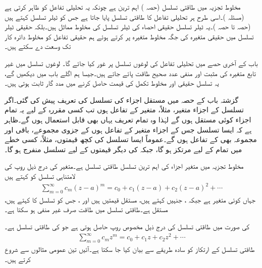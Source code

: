 مخلوط تجزیہ میں طاقتی تسلسل (حصہ )  اہم ترین ہے چونکہ یہ تحلیلی تفاعل کو ظاہر کرتی ہے (مسئلہ )۔اسی طرح ہر تحلیلی تفاعل کا طاقتی تسلسل پایا جاتا ہے جس کو ٹیلر تسلسل کہتے ہیں (حصہ  تا حصہ )۔یہ  ٹیلر تسلسل حقیقی احصاء کی ٹیلر تسلسل کی مخلوط مماثل ہیں۔بلکہ حقیقی ٹیلر تسلسل میں حقیقی متغیرہ کی جگہ مخلوط متغیرہ پر کرتے ہوئے ہم حقیقی تفاعل کو مخلوط دائرہ کار تک وسعت دے سکتے ہیں۔

باب کے آخری حصے میں تحلیلی تفاعل کی لوغوں تسلسل پر غور کیا جائے گا۔ لوغوں تسلسل میں غیر تابع متغیرہ کی مثبت اور منفی عدد صحیح طاقت پائے جاتے ہیں۔جیسا ہم اگلے باب میں دیکھیں گے، یہ تسلسل حقیقی اور مخلوط تکمل کی قیمت حاصل کرنے میں مدد گار ثابت ہوتی ہیں۔

گزشتہ باب کے حصہ  میں مستقل اجزاء کی تسلسل کی تعریف پیش کی گئی۔اگر تسلسل کے اجزاء متغیر، مثلاً، متغیر  کے تفاعل  ہوں تب کسی مقررہ  کے لیے یہ تمام اجزاء کوئی مستقل ہوں گے لہٰذا وہ تمام تعریف یہاں بھی قابل استعمال ہوں گے۔ظاہر ہے کہ ایسا تسلسل جس کے اجزاء متغیر  کے تفاعل ہوں کے جزوی مجموعے، باقی اور مجموعہ بھی  کے تفاعل ہوں گے۔عموماً ایسا تسلسل  کی کچھ قیمتوں، مثلاً، کسی خطے میں تمام   کے لیے مرتکز ہو گا، جبکہ  کی دیگر قیمتوں کے لیے تسلسل منفرج ہو گا۔ 

مخلوط تجزیہ میں متغیر اجزاء کی اہم ترین تسلسل طاقتی تسلسل ہے۔متغیر   کی   درج ذیل روپ کی لامتناہی تسلسل کو کہتے ہیں
\begin{align}\label{مساوات_ٹیلر_طاقتی_تسلسل_الف}
\sum\limits_{m=0}^{\infty} c_m(z-a)^m=c_0+c_1(z-a)+c_2(z-a)^2+\cdots
\end{align}
 جہاں  کوئی متغیر ہے جبکہ ، جنہیں  کہتے ہیں، مستقل قیمتیں ہیں اور ، جس کو تسلسل کا  کہتے ہیں، مستقل ہے۔طاقتی تسلسل  میں طاقت  صرف غیر منفی ہو سکتا ہے۔

 کی صورت میں طاقتی تسلسل کی درج ذیل مخصوص روپ حاصل ہوتی ہے جو  کی طاقتی تسلسل ہے۔
\begin{align}\label{مساوات_ٹیلر_طاقتی_تسلسل_ب}
\sum\limits_{m=0}^{\infty} c_mz^m=c_0+c_1z+c_2z^2+\cdots
\end{align}
 طاقتی تسلسل کے  ارتکاز کو سادہ طریقے سے بیان کیا جا سکتا ہے۔آئیں تین عمومی مثالوں سے شروع کرتے ہیں۔

